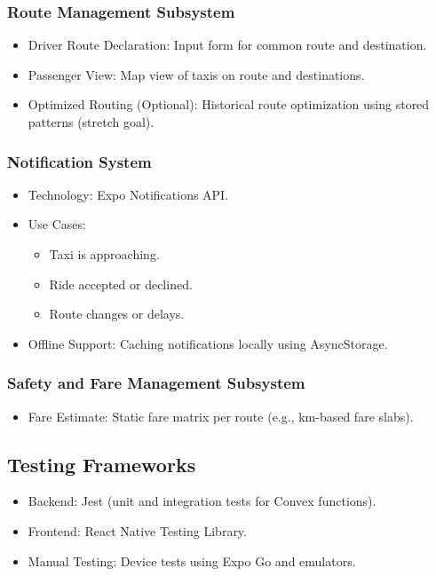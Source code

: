 \documentclass[a4paper,12pt]{article}
\begin{document}
\subsubsection*{Route Management Subsystem}
\begin{itemize}
    \item Driver Route Declaration: Input form for common route and destination.
    \item Passenger View: Map view of taxis on route and destinations.
    \item Optimized Routing (Optional): Historical route optimization using stored patterns (stretch goal).
\end{itemize}

\subsubsection*{Notification System}
\begin{itemize}
    \item Technology: Expo Notifications API.
    \item Use Cases:
    \begin{itemize}
        \item Taxi is approaching.
        \item Ride accepted or declined.
        \item Route changes or delays.
    \end{itemize}
    \item Offline Support: Caching notifications locally using AsyncStorage.
\end{itemize}

\subsubsection*{Safety and Fare Management Subsystem}
\begin{itemize}
    \item Fare Estimate: Static fare matrix per route (e.g., km-based fare slabs).
\end{itemize}

\subsection{Testing Frameworks}
\begin{itemize}
    \item Backend: Jest (unit and integration tests for Convex functions).
    \item Frontend: React Native Testing Library.
    \item Manual Testing: Device tests using Expo Go and emulators.
\end{itemize}
\end{document}
